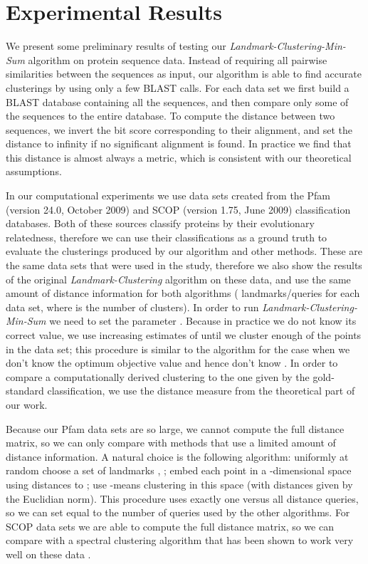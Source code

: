 \documentclass{llncs} \usepackage{algorithm}
\begin{document}
\section{Experimental Results}

We present some preliminary results of testing our \emph{Landmark-Clustering-Min-Sum} algorithm on protein sequence data.  Instead of requiring all pairwise similarities between the sequences as input, our algorithm is able to find accurate clusterings by using only a few BLAST calls.  For each data set we first build a BLAST database containing all the sequences, and then compare only some of the sequences to the entire database.  To compute the distance between two sequences, we invert the bit score corresponding to their alignment, and set the distance to infinity if no significant alignment is found.  In practice we find that this distance is almost always a metric, which is consistent with our theoretical assumptions.


In our computational experiments we use data sets created from the Pfam \cite{pfam} (version 24.0, October 2009) and SCOP \cite{scop} (version 1.75, June 2009) classification databases.  Both of these sources classify proteins by their evolutionary relatedness, therefore we can use their classifications as a ground truth to evaluate the clusterings produced by our algorithm and other methods.  These are the same data sets that were used in the \cite{vbrtx} study, therefore we also show the results of the original \emph{Landmark-Clustering} algorithm on these data, and use the same amount of distance information for both algorithms ( landmarks/queries for each data set, where  is the number of clusters).  In order to run \emph{Landmark-Clustering-Min-Sum} we need to set the parameter .  Because in practice we do not know its correct value, we use increasing estimates of  until we cluster enough of the points in the data set; this procedure is similar to the algorithm for the case when we don't know the optimum objective value  and hence don't know . In order to compare a computationally derived clustering to the one given by the gold-standard classification, we use the distance measure from the theoretical part of our work.


Because our Pfam data sets are so large, we cannot compute the full distance matrix, so we can only compare with methods that use a limited amount of distance information.  A natural choice is the following algorithm: uniformly at random choose a set of landmarks , ; embed each point in a -dimensional space using distances to ; use -means clustering in this space (with distances given by the Euclidian norm).  This procedure uses exactly  one versus all distance queries, so we can set  equal to the number of queries used by the other algorithms.  For SCOP data sets we are able to compute the full distance matrix, so we can compare with a spectral clustering algorithm that has been shown to work very well on these data \cite{spectralClusteringProteinSeqs}.
\end{document}
